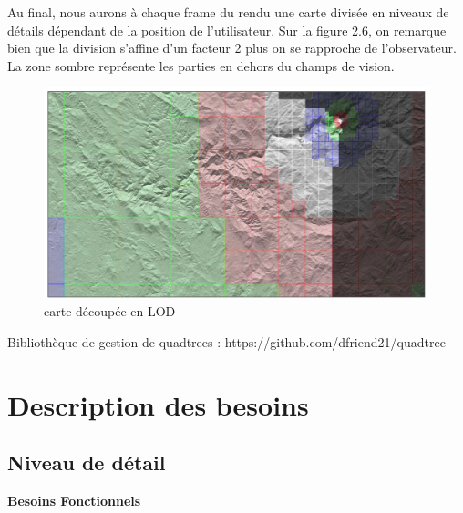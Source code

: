 \documentclass[12pt]{report}
\begin{document}
Au final, nous aurons à chaque frame du rendu une carte divisée en niveaux de détails dépendant de la position de l'utilisateur. Sur la figure 2.6, on remarque bien que la division s'affine d'un facteur 2 plus on se rapproche de l'observateur. La zone sombre représente les parties en dehors du champs de vision. 

\vspace{0.3cm}

\begin{figure}[h]
\centering
\includegraphics[scale = 0.6]{images/CDLOD2.PNG}
\caption{carte découpée en LOD}
\end{figure}


Bibliothèque de gestion de quadtrees : https://github.com/dfriend21/quadtree

\newpage

\chapter{Description des besoins}

\section{Niveau de détail}

\textbf{Besoins Fonctionnels}
\end{document}
